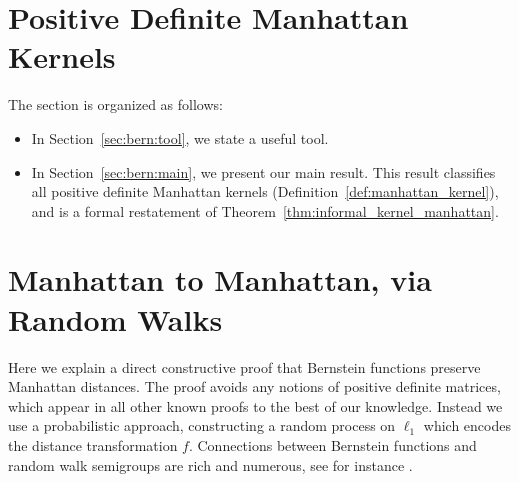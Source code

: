 
\section{Positive Definite Manhattan Kernels}\label{sec:bern}

The section is organized as follows:
\begin{itemize}
    \item In Section~\ref{sec:bern:tool}, we state a useful tool.
    \item In Section~\ref{sec:bern:main}, we present our main result. This result classifies all positive definite Manhattan kernels (Definition~\ref{def:manhattan_kernel}), and is a formal restatement of Theorem~\ref{thm:informal_kernel_manhattan}.
\end{itemize}
\iffalse
\section{Manhattan to Manhattan, via Random Walks}
\label{sec:bern}

Here we explain a direct constructive proof that Bernstein functions preserve Manhattan distances. The proof avoids any notions of positive definite matrices, which appear in all other known proofs to the best of our knowledge. Instead we use a probabilistic approach, constructing a random process on $\ell_1$ which encodes the distance transformation $f$. Connections between Bernstein functions and random walk semigroups are rich and numerous, see for instance \cite[Chapter 5]{vss12}.


\begin{theorem}
 
\end{theorem}

